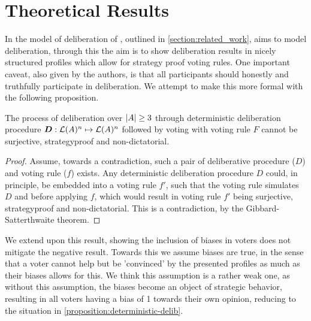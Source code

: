 \newpage
\chapter{Theoretical Results}
\label{theory}


In the model of deliberation of \citet{radDeliberationSinglePeakednessCoherent2021a}, outlined in \cref{section:related_work}, aims to model deliberation, through this the aim is to show deliberation results in nicely structured profiles which allow for strategy proof voting rules. One important caveat, also given by the authors, is that all participants should honestly and truthfully participate in deliberation. We attempt to make this more formal with the following proposition.

\begin{proposition}{}\label{proposition:deterministic-delib}
	The process of deliberation over $|A| \geq 3$ through deterministic deliberation procedure \(\boldsymbol{D}: \mathcal{L}(A)^n \mapsto \mathcal{L}(A)^n\) followed by voting with voting rule $F$ cannot be surjective, strategyproof and non-dictatorial.
\end{proposition}

\begin{proof}{} 
	Assume, towards a contradiction, such a pair of deliberative procedure ($D$) and voting rule (\(f\)) exists. Any deterministic deliberation procedure $D$ could, in principle, be embedded into a voting rule $f'$, such that the voting rule simulates $D$ and before applying $f$, which would result in  voting rule $f'$ being surjective, strategyproof and non-dictatorial. This is a contradiction, by the Gibbard-Satterthwaite theorem\citep{gibbardManipulationVotingSchemes1973,satterthwaiteStrategyproofnessArrowsConditions1975}.
\end{proof}


We extend upon this result, showing the inclusion of biases in voters does not mitigate the negative result. Towards this we assume biases are true, in the sense that a voter cannot help but be 'convinced' by the presented profiles as much as their biases allows for this. We think this assumption is a rather weak one, as without this assumption, the biases become an object of strategic behavior, resulting in all voters having a bias of 1 towards their own opinion, reducing to the situation in \cref{proposition:deterministic-delib}.

